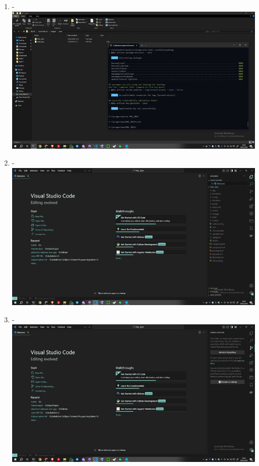 \documentclass[12pt,titlepage]{article}
\begin{document}
\begin{enumerate}[label= \alph*.]
    \item - \\ \includegraphics[width=.9\textwidth]{images/figures/Github Publish 1.jpg}
    \item - \\ \includegraphics[width=.9\textwidth]{images/figures/Github Publish 2.jpg}
    \newpage
    \item - \\ \includegraphics[width=.9\textwidth]{images/figures/Github Publish 3.jpg}

\end{enumerate}
\end{document}
